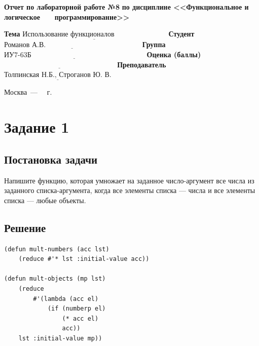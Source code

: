 \documentclass[12pt]{report}
\begin{document}
\begin{titlepage}
		\begin{center}
			\noindent\begin{minipage}{1.1\textwidth}\centering
				\Large\textbf{  Отчет по лабораторной работе №8}\newline
				\textbf{по дисциплине <<Функциональное и логическое}\newline
				\textbf{~~~программирование>>}\newline\newline
			\end{minipage}
		\end{center}
		
		\noindent\textbf{Тема} $\underline{\text{Использование функционалов~~~~~~~~~~~~~~~~~~~~~~}}$\newline\newline
		\noindent\textbf{Студент} $\underline{\text{Романов А.В.~~~~~~~~~~~~~~~~~~~~~~~~~~~~~~~~~~~~~~~~}}$\newline\newline
		\noindent\textbf{Группа} $\underline{\text{ИУ7-63Б~~~~~~~~~~~~~~~~~~~~~~~~~~~~~~~~~~~~~~~~~~~~~~~~}}$\newline\newline
		\noindent\textbf{Оценка (баллы)} $\underline{\text{~~~~~~~~~~~~~~~~~~~~~~~~~~~~~~~~~~~~~~~~~~~~~~~}}$\newline\newline
		\noindent\textbf{Преподаватель} $\underline{\text{Толпинская Н.Б., Строганов Ю. В.}}$\newline\newline\newline
		
		\begin{center}
			\vfill
			Москва~---~\the\year
			~г.
		\end{center}
	\end{titlepage}
	
	
\section*{Задание 1}
\subsection*{Постановка задачи}
Напишите функцию, которая умножает на заданное число-аргумент все числа из заданного списка-аргумента, когда все элементы списка --- числа и все элементы списка --- любые объекты.

\subsection*{Решение}
\begin{lstlisting}
(defun mult-numbers (acc lst)
	(reduce #'* lst :initial-value acc))

(defun mult-objects (mp lst)
	(reduce
		#'(lambda (acc el)
			(if (numberp el)
				(* acc el)
				acc))
	lst :initial-value mp))
\end{lstlisting}
\end{document}
